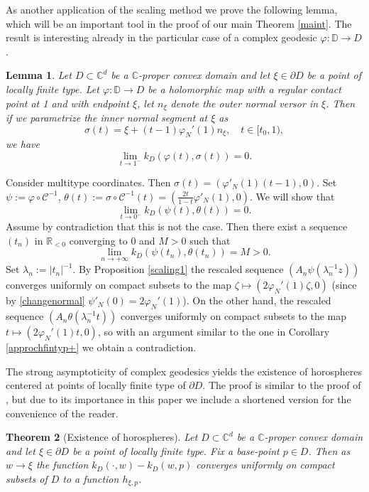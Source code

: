\documentclass[11pt, reqno]{amsart}
\numberwithin{equation}{section}
\newtheorem{theorem}{Theorem}[section]
\newtheorem{lemma}[theorem]{Lemma}
\theoremstyle{definition}
\newcommand{\C}{\mathbb{C}}
\newcommand{\D}{\mathbb{D}}
\newcommand{\R}{\mathbb{R}}
\begin{document}
{		As another application of the scaling method we prove the following lemma, which will be an important tool in the proof of our main Theorem \ref{maint}. The result is interesting already in the particular case of a complex geodesic $\varphi\colon \D\to D$.
		\begin{lemma}\label{normalrestricted}
			Let $D\subset\C^d$ be a $\C$-proper convex domain and let $\xi\in\partial D$ be a point of locally finite type. 
			Let $\varphi\colon \D\to D$ be a holomorphic map with a regular contact point at 1 and with endpoint $\xi$, let $n_\xi$ denote the outer normal versor in $\xi$. Then  if we parametrize the inner normal segment at $\xi$  as
			$$\sigma(t)=\xi+(t-1)\varphi_N'(1)n_\xi, \quad t\in[t_0,1),$$
			we have
			$$\lim_{t\to1^-}k_D(\varphi(t),\sigma(t))=0.$$
		\end{lemma}
		\proof
		Consider  multitype coordinates. Then $\sigma(t)=(\varphi'_N(1)(t-1),0)$. Set $\psi:=\varphi\circ\mathscr{C}^{-1}$, $\theta(t):=\sigma\circ \mathscr{C}^{-1}(t)=\left(\frac{2t}{1-t}\varphi'_N(1),0\right)$. We will show that
		$$\lim_{t\to0^-}k_D(\psi(t),\theta(t))=0.$$
		Assume by contradiction that this is not the case. Then there exist a sequence $(t_n)$ in $\R_{<0}$ converging to 0 and $M>0$ such that
		$$\lim_{n\to+\infty}k_D(\psi(t_n),\theta(t_n))=M>0.$$
		Set $\lambda_n:=|t_n|^{-1}$. By Proposition \ref{scaling1}  the rescaled sequence $(A_n\psi(\lambda^{-1}_n z))$ converges uniformly on compact subsets to the map $\zeta\mapsto(2\varphi_N'(1)\zeta,0)$ (since by \eqref{changenormal}  $\psi'_N(0)=2\varphi_N'(1)$).
		On the other hand,  the rescaled sequence $(A_n\theta(\lambda^{-1}_n t))$ converges uniformly on compact subsets to the map $t\mapsto (2\varphi_N'(1)t,0)$, so with an argument similar to the one in Corollary \ref{approchfintyp+} we obtain a contradiction.
		\endproof
		
		
		
		
		The strong asymptoticity of complex geodesics yields  the existence of horospheres centered at points of locally finite type of $\partial D$. The proof is similar  to the proof of \cite[Theorem 3.5]{AFGG}, but due to its importance in this paper we include a shortened version for the convenience of the reader.
		
		\begin{theorem}[Existence of horospheres]\label{existencehorospheres} Let $D\subset\C^d$ be a $\C$-proper convex domain and let $\xi\in\partial D$ be a point of locally finite type. Fix a base-point  $p\in D$. Then as $w\to \xi$  the function $ k_D(\cdot,w)-k_D(w,p)$ converges uniformly on compact subsets of $D$ to a function $h_{\xi,p}$.
		\end{theorem}
		
}
\end{document}
